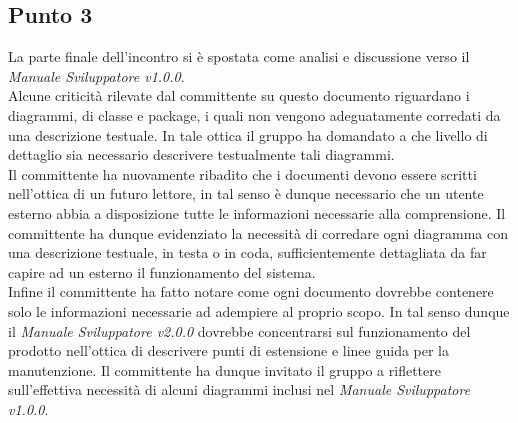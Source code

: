 \subsection{Punto 3}
La parte finale dell'incontro si è spostata come analisi e discussione verso il \textit{Manuale Sviluppatore v1.0.0}.\\
Alcune criticità rilevate dal committente su questo documento riguardano i diagrammi, di classe e package, i quali non vengono adeguatamente corredati da una descrizione testuale. In tale ottica il gruppo ha domandato a che livello di dettaglio sia necessario descrivere testualmente tali diagrammi.\\
Il committente ha nuovamente ribadito che i documenti devono essere scritti nell'ottica di un futuro lettore, in tal senso è dunque necessario che un utente esterno abbia a disposizione tutte le informazioni necessarie alla comprensione. Il committente ha dunque evidenziato la necessità di corredare ogni diagramma con una descrizione testuale, in testa o in coda, sufficientemente dettagliata da far capire ad un esterno il funzionamento del sistema.\\
Infine il committente ha fatto notare come ogni documento dovrebbe contenere solo le informazioni necessarie ad adempiere al proprio scopo. In tal senso dunque il \textit{Manuale Sviluppatore v2.0.0} dovrebbe concentrarsi sul funzionamento del prodotto nell'ottica di descrivere punti di estensione e linee guida per la manutenzione. Il committente ha dunque invitato il gruppo a riflettere sull'effettiva necessità di alcuni diagrammi inclusi nel \textit{Manuale Sviluppatore v1.0.0}.

